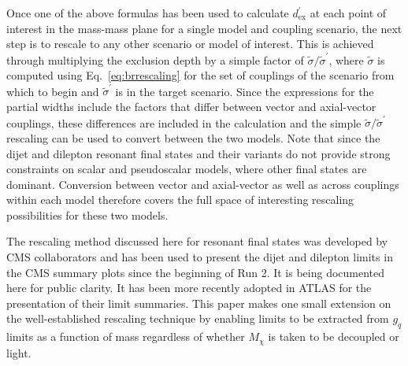 \documentclass[a4paper, 11pt]{article}
\newcommand{\mdm}{\ensuremath{M_{\chi}}\xspace}
\begin{document}
Once one of the above formulas has been used to calculate $d_\text{ex}^\prime$ at each point of interest in the mass-mass plane for a single model and coupling scenario, the next step is to rescale to any other scenario or model of interest. This is achieved through multiplying the exclusion depth by a simple factor of $\tilde{\sigma}/\tilde{\sigma}^\prime$, where $\tilde{\sigma}$ is computed using Eq.~\ref{eq:brrescaling} for the set of couplings of the scenario from which to begin and $\tilde{\sigma}^\prime$ is in the target scenario.
Since the expressions for the partial widths include the factors that differ between vector and axial-vector couplings, these differences are included in the calculation and the simple $\tilde{\sigma}/\tilde{\sigma}^\prime$ rescaling can be used to convert between the two models. Note that since the dijet and dilepton resonant final states and their variants do not provide strong constraints on scalar and pseudoscalar models, where other final states are dominant. Conversion between vector and axial-vector as well as across couplings within each model therefore covers the full space of interesting rescaling possibilities for these two models.

The rescaling method discussed here for resonant final states was developed by CMS collaborators and has been used to present the dijet and dilepton limits in the CMS summary plots since the beginning of Run 2. It is being documented here for public clarity. It has been more recently adopted in ATLAS for the presentation of their limit summaries. This paper makes one small extension on the well-established rescaling technique by enabling limits to be extracted from $g_q$ limits as a function of mass regardless of whether \mdm is taken to be decoupled or light. 
\end{document}

